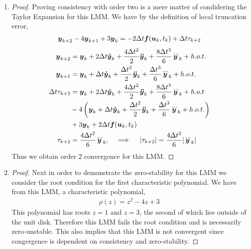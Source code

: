 \documentclass{article}
\begin{document}
\begin{enumerate}[label=\alph*)]

  \item 
    
  \begin{proof}
    Proving consistency with order two is a mere matter of condidering the
    Taylor Expansion for this LMM. We have by the definition of local truncation
    error, 
    \begin{align}
       \boldsymbol{y}_{k+2} - 4\boldsymbol{y}_{k+1} + 3\boldsymbol{y}_k = -2\Delta t\boldsymbol{f}(\boldsymbol{u}_k, t_k) + \Delta t\tau_{k+2}
    \end{align}
    \begin{align*}
       \boldsymbol{y}_{k+2} &= \boldsymbol{y}_k + 2\Delta t \boldsymbol{\dot{y}}_k +
       \frac{4\Delta t^2}{2}\boldsymbol{\ddot{y}}_k + \frac{8\Delta t^3}{6}\boldsymbol{\dddot{y}}_k +  h.o.t.\\
       \boldsymbol{y}_{k+1} &= \boldsymbol{y}_k + \Delta t \boldsymbol{\dot{y}}_k + \frac{\Delta t^2}{2}\boldsymbol{\ddot{y}}_k 
       + \frac{\Delta t^3}{6}\boldsymbol{\dddot{y}}_k +h.o.t. \\
       \Delta t\tau_{k+2} &=  \boldsymbol{y}_k + 2\Delta t \boldsymbol{\dot{y}}_k +
       \frac{4\Delta t^2}{2}\boldsymbol{\ddot{y}}_k + \frac{8\Delta t^3}{6}\boldsymbol{\dddot{y}}_k +
       h.o.t \\ &- 4\left(\boldsymbol{y}_k + \Delta t \boldsymbol{\dot{y}}_k + \frac{\Delta t^2}{2}\boldsymbol{\ddot{y}}_k 
       + \frac{\Delta t^3}{6}\boldsymbol{\dddot{y}}_k +h.o.t. \right)\\ &+ 3\boldsymbol{y}_k +
       2\Delta t\boldsymbol{f}(\boldsymbol{u}_k, t_k)\\
       \tau_{k+2} &=  \frac{4\Delta t^2}{6}\boldsymbol{\dddot{y}}_k, \quad \implies \quad
       |\tau_{k+2}| = \frac{4\Delta t^2}{6}|\boldsymbol{\dddot{y}}_k|
    \end{align*}
    Thus we obtain order 2 convergence for this LMM.
  \end{proof}

  \item 

  \begin{proof}
    Next in order to demonstrate the zero-stability for this LMM we consider the
    root condition for the first characteristic polynomial. We have from this
    LMM, a characteristic polynomial, 
    \begin{align}
        \rho(z) = z^2 - 4z + 3
    \end{align}
    This polynomial has roots $z = 1$ and $z = 3$, the second of which lies
    outside of the unit disk. Therefore this LMM fails the root condition and is
    necessarily zero-unstable. This also implies that this LMM is not convergent
    since congergence is dependent on consistency and zero-stability. 
  \end{proof}


\end{enumerate}
\end{document}
